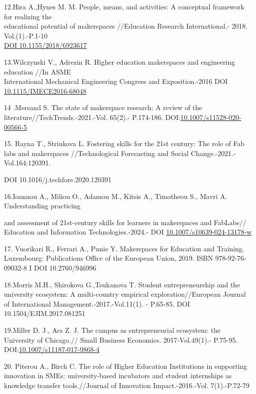 \begin{references}
12.Hira A.,Hynes M. M. People, means, and activities: A conceptual
framework for realizing the \\educational potential of makerspaces
//Education Research International.- 2018. Vol.(1).-P.1-10\\
\href{https://doi.org/10.1155/2018/6923617}{DOI 10.1155/2018/6923617}

13.Wilczynski V., Adrezin R. Higher education makerspaces and
engineering education //In ASME \\International Mechanical Engineering
Congress and Exposition.-2016 DOI
\href{http://dx.doi.org/10.1115/IMECE2016-68048}{10.1115/IMECE2016-68048}

14 .Mersand S. The state of makerspace research: A review of the
literature//TechTrends.-2021.-Vol. 65(2).- P.174-186.
DOI:\href{http://dx.doi.org/10.1007/s11528-020-00566-5}{10.1007/s11528-020-00566-5}

15. Rayna T., Striukova L. Fostering skills for the 21st century: The
role of Fab labs and makerspaces //Technological Forecasting and Social
Change.-2021.-Vol.164:120391.

DOI 10.1016/j.techfore.2020.120391

16.Ioannou A., Miliou O., Adamou M., Kitsis A., Timotheou S., Mavri A.
Understanding practicing

and assessment of 21st-century skills for learners in makerspaces and
FabLabs// Education and Information Technologies.-2024.- DOI
\href{https://doi.org/10.1007/s10639-024-13178-w}{10.1007/s10639-024-13178-w}

17. Vuorikari R., Ferrari A., Punie Y. Makerspaces for Education and
Training. Luxembourg: Publications Office of the European Union, 2019.
ISBN 978-92-76-09032-8 I DOI 10.2760/946996

18.Morris M.H., Shirokova G.,Tsukanova T. Student entrepreneurship and
the university ecosystem: A multi-country empirical
exploration//European Journal of International
Management.-2017.-Vol.11(1). - P.65-85. DOI 10.1504/EJIM.2017.081251

19.Miller D. J., Acs Z. J. The campus as entrepreneurial ecosystem: the
University of Chicago.// Small Business Economics. 2017-Vol.49(1).-
P.75-95.
DOI:\href{https://link.springer.com/article/10.1007/s11187-017-9868-4}{10.1007/s11187-017-9868-4}

20. Piterou A., Birch C. The role of Higher Education Institutions in
supporting innovation in SMEs: university-based incubators and student
internships as knowledge transfer tools.//Journal of Innovation
Impact.-2016.-Vol. 7(1).-P.72-79


\end{references}
